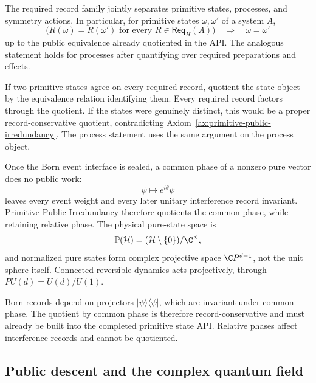 \begin{proposition}
\label{prop:joint-public-separation}
The required record family jointly separates primitive states, processes, and
symmetry actions.  In particular, for primitive states \(\omega,\omega'\) of a system
\(A\),
\[
 \bigl( R(\omega)=R(\omega')\text{ for every }R\in\mathsf{Req}_H(A)\bigr)
 \quad\Longrightarrow\quad
 \omega=\omega'
\]
up to the public equivalence already quotiented in the API.  The analogous statement
holds for processes after quantifying over required preparations and effects.
\end{proposition}

\begin{proofsketch}
If two primitive states agree on every required record, quotient the state object by
the equivalence relation identifying them.  Every required record factors through
the quotient.  If the states were genuinely distinct, this would be a proper
record-conservative quotient, contradicting
Axiom~\ref{ax:primitive-public-irredundancy}.  The process statement uses the same
argument on the process object.
\end{proofsketch}

\begin{corollary}
\label{cor:projective-pure-states}
Once the Born event interface is sealed, a common phase of a nonzero pure vector does
no public work:
\[
  \psi\longmapsto e^{i\theta}\psi
\]
leaves every event weight and every later unitary interference record invariant.
Primitive Public Irredundancy therefore quotients the common phase, while retaining
relative phase.  The physical pure-state space is
\[
  \mathbb P(\mathcal H)
  = (\mathcal H\setminus\{0\})/\C^\times,
\]
and normalized pure states form complex projective space
\(\C P^{d-1}\), not the unit sphere itself.  Connected reversible dynamics acts
projectively, through \(PU(d)=U(d)/U(1)\).
\end{corollary}

\begin{proofsketch}
Born records depend on projectors
\(\lvert\psi\rangle\!\langle\psi\rvert\), which are invariant under common phase.
The quotient by common phase is therefore record-conservative and must already be
built into the completed primitive state API.  Relative phases affect interference
records and cannot be quotiented.
\end{proofsketch}

\subsection{Public descent and the complex quantum field}

